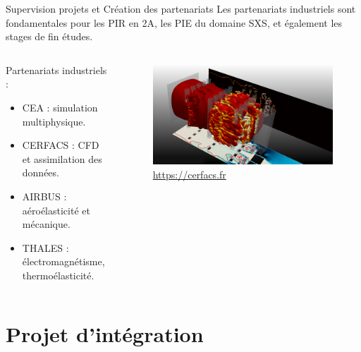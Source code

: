 \documentclass[aspectratio=169, french]{ISAE-Beamer}
\begin{document}
\begin{frame}{Supervision projets et Création des partenariats}	
Les partenariats industriels sont fondamentales pour les PIR en 2A, les PIE du domaine SXS, et également les stages de fin études.


\begin{columns}
	\begin{column}{.5\textwidth}
	Partenariats industriels : 
	\begin{itemize}
		\item CEA : simulation multiphysique.
		\item CERFACS : CFD et assimilation des données. 
		\item AIRBUS : aéroélasticité et mécanique.
		\item THALES : électromagnétisme, thermoélasticité.
	\end{itemize}
	\end{column}
	\begin{column}{.43\textwidth}
	\begin{figure}
		\includegraphics[width=1\textwidth]{image_CERFACS.png}
		\caption{\href{https://cerfacs.fr/logiciels-de-simulation-pour-la-mecanique-des-fluides/}{https://cerfacs.fr}}
	\end{figure}	
	\end{column}
\end{columns}
	
\end{frame}

\section{Projet d'intégration}
\end{document}
